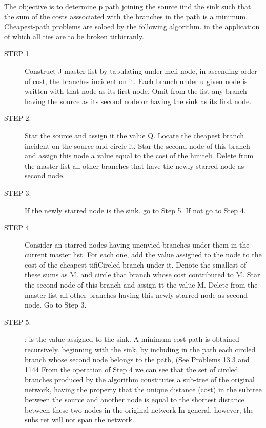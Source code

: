 \documentclass[11pt]{article} %
\begin{document}
The objective is to determine p path joining the source iind the sink such that the sum of the costs asssociated with the branches in the path is a minimum, Cheapest-path problems are soloed by the following algorithm. in the application of which all ties are to be broken tirbitranly. 
\begin{description}
\item[STEP 1.] Construct J master list by tabulating under meli node, in ascending order of cost, the branches incident on it. Each branch under u given node is written with that node as its first node. Omit from the list any branch having the source as its second node or having the sink as its first node. 

\item[STEP 2.] Star the source and assign it the value Q. Locate the cheapest branch incident on the source and circle it. Star the second node of this branch and assign this node a value equal to the cosi of the hmiteli. Delete from the master list all other branches that have the newly starred node as second node. 

\item[STEP 3.] If the newly starred node is the sink. go to Step 5. If not go to Step 4. 

\item[STEP 4.] Consider an starred nodes having unenvied branches under them in the current master list. For each one, add the value assigned to the node to the cost of the cheapest tifiCireled branch under it. Denote the smallest of these sums as M. and circle that branch whose cost contributed to M. Star the second node of this branch and assign tt the value M. Delete from the master list all other branches having this newly starred node as second node. Go to Step 3. 

\item[STEP 5.] : is the value assigned to the sink. A minimum-cost path is obtained recursively. beginning with the sink, by including in the path each circled branch whose second node belongs to the path, (See Problems 13.3 and 1144 From the operation of Step 4 we can see that the set of circled branches produced by the algorithm constitutes a sub-tree of the original network, having the property that the unique distance (cost) in the subtree between the source and another node is equal to the shortest 
distance between these two nodes in the original network In general. however, the subs ret will not span the network. 
\end{description}
\end{document}
